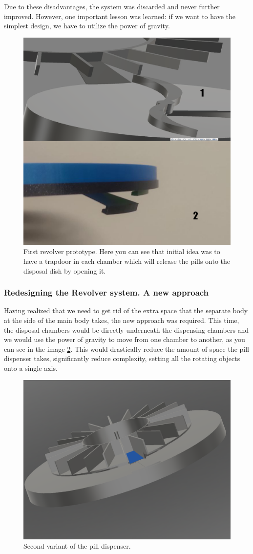 Due to these disadvantages, the system was discarded and never further improved. However, one important lesson was learned: if we want to have the simplest design, we have to utilize the power of gravity.
\begin{figure}[h]
	\centering
	\includegraphics[width=0.7\linewidth]{Figures/Untitled-2}
	\caption[First revolver prototype]{First revolver prototype. Here you can see that initial idea was to have a trapdoor in each chamber which will release the pills onto the disposal dish by opening it.}
	\label{fig:screenshot1}
\end{figure}
\newpage
\subsubsection{Redesigning the Revolver system. A new approach}
Having realized that we need to get rid of the extra space that the separate body at the side of the main body takes, the new approach was required. This time, the disposal chambers would be directly underneath the dispensing chambers and we would use the power of gravity to move from one chamber to another, as you can see in the image \ref{fig:pspd2}. This would drastically reduce the amount of space the pill dispenser takes, significantly reduce complexity, setting all the rotating objects onto a single axis.


\begin{figure}[h]
	\centering
	\includegraphics[width=0.7\linewidth]{Figures/PSPD2}
	\caption[2 Variant of the pill dispenser.]{Second variant of the pill dispenser.}
	\label{fig:pspd2}
\end{figure}

